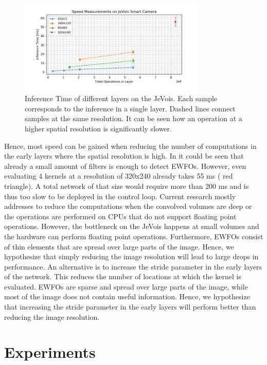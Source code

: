 \begin{figure}[hbtp]
	\centering
	\includegraphics[width=0.8\textwidth]{fig/bottleneck_jevois}
	\caption{Inference Time of different layers on the JeVois. Each sample corresponds to the inference in a single layer. Dashed lines connect samples at the same resolution. It can be seen how an operation at a higher spatial resolution is significantly slower.}
	\label{fig:bottleneck_jevois}
\end{figure}

Hence, most speed can be gained when reducing the number of computations in the early layers where the spatial resolution is high. In  it could be seen that already a small amount of filters is enough to detect \acp{EWFO}. However, even evaluating 4 kernels at a resolution of 320x240 already takes 55 ms ( red triangle). A total network of that size would require more than 200 ms and is thus too slow to be deployed in the control loop. Current research mostly addresses to reduce the computations when the convolved volumes are deep or the operations are performed on \acp{CPU} that do not support floating point operations. However, the bottleneck on the JeVois happens at small volumes and the hardware can perform floating point operations. Furthermore, \acp{EWFO} consist of thin elements that are spread over large parts of the image. Hence, we hypothesize that simply reducing the image resolution will lead to large drops in performance. An alternative is to increase the stride parameter in the early layers of the network. This reduces the number of locations at which the kernel is evaluated. \acp{EWFO} are sparse and spread over large parts of the image, while most of the image does not contain useful information. Hence, we hypothesize that increasing the stride parameter in the early layers will perform better than reducing the image resolution.

\section{Experiments}

